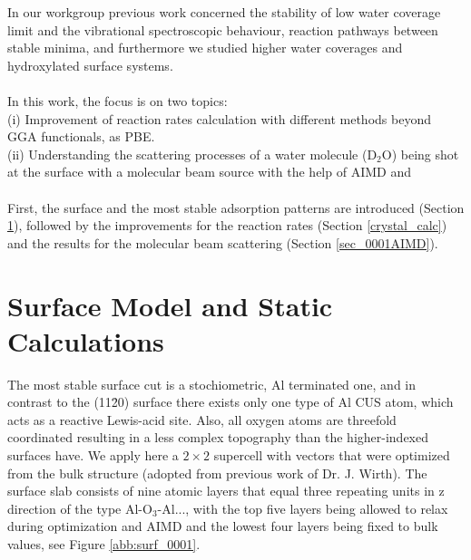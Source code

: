 \documentclass[11pt,DIV=13,BCOR=5mm,a4paper,headinclude]{scrbook}
\begin{document}
In our workgroup previous work concerned the stability of low water coverage limit and the vibrational spectroscopic behaviour, reaction pathways between stable minima, and furthermore we studied higher water coverages and hydroxylated surface systems\cite{WirthJPCC2012,Wirth2014,Wirth2015}.
\\\\

In this work, the focus is on two topics:
\\
(i) Improvement of reaction rates calculation with different methods beyond GGA functionals, as PBE.
\\
(ii) Understanding the scattering processes of a water molecule (D$_2$O) being shot at the surface with a molecular beam source with the help of AIMD and
\\\\
First, the surface and the most stable adsorption patterns are introduced (Section \ref{sec_0001surf}), followed by the improvements for the reaction rates (Section \ref{crystal_calc}) and the results for the molecular beam scattering\cite{Heiden0001_2018} (Section \ref{sec_0001AIMD}).
	
\section{Surface Model and Static Calculations}\label{sec_0001surf}

The most stable surface cut is a stochiometric, Al terminated one, and in contrast to the (11\=20) surface there exists only one type of Al CUS atom, which acts as a reactive Lewis-acid site.
Also, all oxygen atoms are threefold coordinated resulting in a less complex topography than the higher-indexed surfaces have.
We apply here a $2\times 2$ supercell with vectors that were optimized from the bulk structure (adopted from previous work of Dr. J. Wirth\cite{WirthJPCC2012}).
The surface slab consists of nine atomic layers that equal three repeating units in z direction of the type Al-O$_3$-Al..., with the top five layers being allowed to relax during optimization and AIMD and the lowest four layers being fixed to bulk values, see Figure \ref{abb:surf_0001}.
\end{document}
